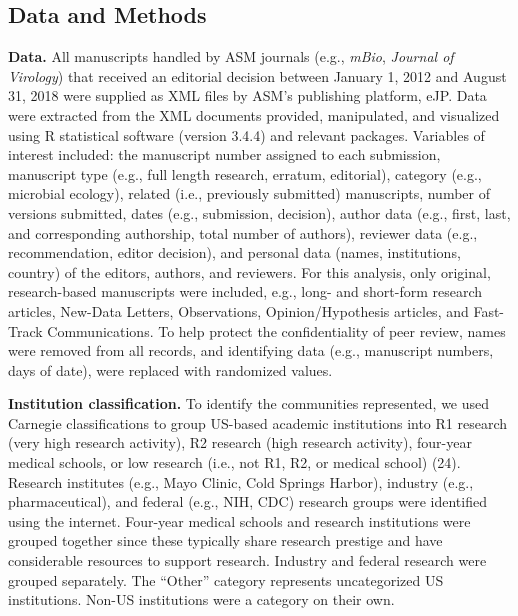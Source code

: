 \documentclass[11pt,]{article}
\begin{document}
\subsection{Data and Methods}\label{data-and-methods}

\textbf{Data.} All manuscripts handled by ASM journals (e.g.,
\emph{mBio}, \emph{Journal of Virology}) that received an editorial
decision between January 1, 2012 and August 31, 2018 were supplied as
XML files by ASM's publishing platform, eJP. Data were extracted from
the XML documents provided, manipulated, and visualized using R
statistical software (version 3.4.4) and relevant packages. Variables of
interest included: the manuscript number assigned to each submission,
manuscript type (e.g., full length research, erratum, editorial),
category (e.g., microbial ecology), related (i.e., previously submitted)
manuscripts, number of versions submitted, dates (e.g., submission,
decision), author data (e.g., first, last, and corresponding authorship,
total number of authors), reviewer data (e.g., recommendation, editor
decision), and personal data (names, institutions, country) of the
editors, authors, and reviewers. For this analysis, only original,
research-based manuscripts were included, e.g., long- and short-form
research articles, New-Data Letters, Observations, Opinion/Hypothesis
articles, and Fast-Track Communications. To help protect the
confidentiality of peer review, names were removed from all records, and
identifying data (e.g., manuscript numbers, days of date), were replaced
with randomized values.

\textbf{Institution classification.} To identify the communities
represented, we used Carnegie classifications to group US-based academic
institutions into R1 research (very high research activity), R2 research
(high research activity), four-year medical schools, or low research
(i.e., not R1, R2, or medical school) (24). Research institutes (e.g.,
Mayo Clinic, Cold Springs Harbor), industry (e.g., pharmaceutical), and
federal (e.g., NIH, CDC) research groups were identified using the
internet. Four-year medical schools and research institutions were
grouped together since these typically share research prestige and have
considerable resources to support research. Industry and federal
research were grouped separately. The ``Other'' category represents
uncategorized US institutions. Non-US institutions were a category on
their own.
\end{document}
